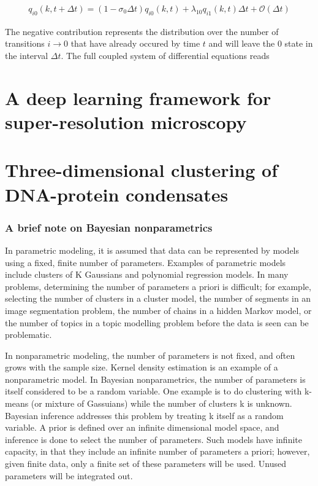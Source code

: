 \documentclass{ucetd}
\begin{document}
\begin{align*}
q_{i0}(k,t+\Delta t) = (1-\sigma_{0}\Delta t)q_{i0}(k,t) + \lambda_{10}q_{i1}(k,t)\Delta t + \mathcal{O}(\Delta t)
\end{align*}

The negative contribution represents the distribution over the number of transitions $i\rightarrow 0$ that have already occured by time $t$ and will leave the $0$ state in the interval $\Delta t$. The full coupled system of differential equations reads


\chapter{A deep learning framework for super-resolution microscopy}

\chapter{Three-dimensional clustering of DNA-protein condensates}


\subsection{A brief note on Bayesian nonparametrics}

In parametric modeling, it is assumed that data can be represented by models using a fixed, finite number
of parameters. Examples of parametric models include clusters of K Gaussians and polynomial regression
models. In many problems, determining the number of parameters a priori is difficult; for example, selecting
the number of clusters in a cluster model, the number of segments in an image segmentation problem, the
number of chains in a hidden Markov model, or the number of topics in a topic modelling problem before
the data is seen can be problematic.

In nonparametric modeling, the number of parameters is not fixed, and often grows with the sample size.
Kernel density estimation is an example of a nonparametric model. In Bayesian nonparametrics, the number
of parameters is itself considered to be a random variable. One example is to do clustering with k-means (or
mixture of Gassuians) while the number of clusters k is unknown. Bayesian inference addresses this problem
by treating k itself as a random variable. A prior is defined over an infinite dimensional model space, and
inference is done to select the number of parameters. Such models have infinite capacity, in that they include
an infinite number of parameters a priori; however, given finite data, only a finite set of these parameters
will be used. Unused parameters will be integrated out.
\end{document}

